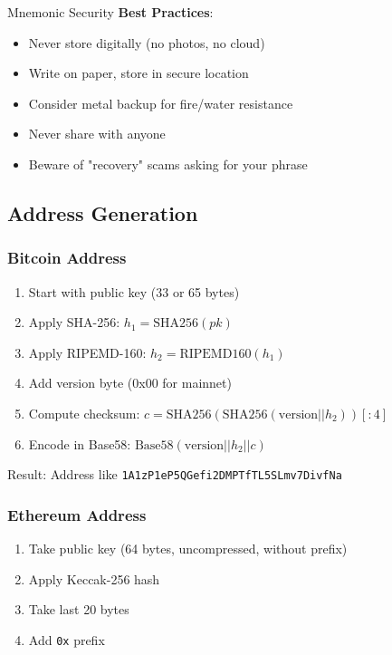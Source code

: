 \documentclass[11pt,a4paper]{article}
\begin{document}
\begin{securitybox}{Mnemonic Security}
\textbf{Best Practices}:
\begin{itemize}
  \item Never store digitally (no photos, no cloud)
  \item Write on paper, store in secure location
  \item Consider metal backup for fire/water resistance
  \item Never share with anyone
  \item Beware of "recovery" scams asking for your phrase
\end{itemize}
\end{securitybox}

\subsection{Address Generation}

\subsubsection{Bitcoin Address}

\begin{enumerate}
  \item Start with public key (33 or 65 bytes)
  \item Apply SHA-256: $h_1 = \text{SHA256}(pk)$
  \item Apply RIPEMD-160: $h_2 = \text{RIPEMD160}(h_1)$
  \item Add version byte (0x00 for mainnet)
  \item Compute checksum: $c = \text{SHA256}(\text{SHA256}(\text{version} || h_2))[:4]$
  \item Encode in Base58: $\text{Base58}(\text{version} || h_2 || c)$
\end{enumerate}

Result: Address like \texttt{1A1zP1eP5QGefi2DMPTfTL5SLmv7DivfNa}

\subsubsection{Ethereum Address}

\begin{enumerate}
  \item Take public key (64 bytes, uncompressed, without prefix)
  \item Apply Keccak-256 hash
  \item Take last 20 bytes
  \item Add \texttt{0x} prefix
\end{enumerate}
\end{document}
